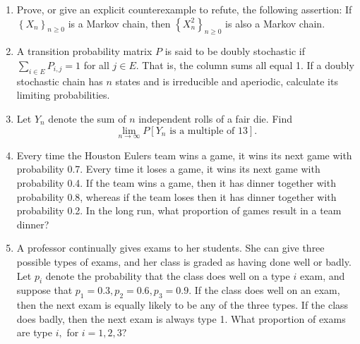 \documentclass{article}
\begin{document}
\begin{enumerate}
\begin{enumerate}[(a)]
		\end{enumerate}

	\item Prove, or give an explicit counterexample to refute, the following assertion: If $\left\{ X_n \right\}_{n\ge0}$ is a Markov chain, then $\left\{ X_n^2 \right\}_{n\ge0}$ is also a Markov chain.

	\item A transition probability matrix $P$ is said to be doubly stochastic if $\displaystyle\sum_{i\in E}^{} P_{i, j}= 1$ for all $j\in E.$ That is, the column sums all equal 1. If a doubly stochastic chain has $n$ states and is irreducible and aperiodic, calculate its limiting probabilities.

	\item Let $Y_n$ denote the sum of $n$ independent rolls of a fair die. Find
		\[\lim_{n\to\infty} P[Y_n\text{ is a multiple of 13}].\]

	\item Every time the Houston Eulers team wins a game, it wins its next game with probability 0.7. Every time it loses a game, it wins its next game with probability 0.4. If the team wins a game, then it has dinner together with probability 0.8, whereas if the team loses then it has dinner together with probability 0.2. In the long run, what proportion of games result in a team dinner?

	\item A professor continually gives exams to her students. She can give three possible types of exams, and her class is graded as having done well or badly. Let $p_i$ denote the probability that the class does well on a type $i$ exam, and suppose that $p_1=0.3, p_2=0.6, p_3=0.9.$ If the class does well on an exam, then the next exam is equally likely to be any of the three types. If the class does badly, then the next exam is always type 1. What proportion of exams are type $i,$ for $i=1, 2, 3?$
		
\end{enumerate}
\end{document}
